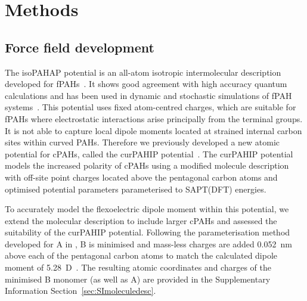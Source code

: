 \section{Methods}
\subsection{Force field development}
The isoPAHAP potential is an all-atom isotropic intermolecular description developed for fPAHs~\cite{totton2010first}. It shows good agreement with high accuracy quantum calculations and has been used in dynamic and stochastic simulations of fPAH systems~\cite{Totton2012quantitative,bowal2019sphere,Grancic2016,Pascazio2017}. This potential uses fixed atom-centred charges, which are suitable for fPAHs where electrostatic interactions arise principally from the terminal groups. It is not able to capture local dipole moments located at strained internal carbon sites within curved PAHs. Therefore we previously developed a new atomic potential for cPAHs, called the curPAHIP potential~\cite{bowal2019ion}. The curPAHIP potential models the increased polarity of cPAHs using a modified molecule description with off-site point charges located above the pentagonal carbon atoms and optimised potential parameters parameterised to SAPT(DFT) energies.

To accurately model the flexoelectric dipole moment within this potential, we extend the molecular description to include larger cPAHs and assessed the suitability of the curPAHIP potential. Following the parameterisation method developed for A in \citet{bowal2019ion}, B is minimised and mass-less charges are added 0.052~nm above each of the pentagonal carbon atoms to match the calculated dipole moment of 5.28~D~\cite{Martin2018flexo}. The resulting atomic coordinates and charges of the minimised B monomer (as well as A) are provided in the Supplementary Information Section~\ref{sec:SImoleculedesc}.

